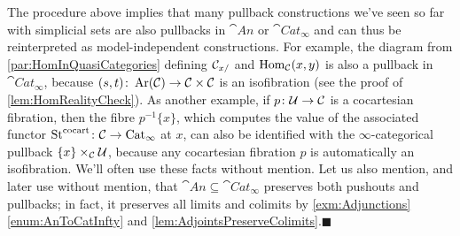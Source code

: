 \begin{numpar}
	The procedure above implies that many pullback constructions we've seen so far with simplicial sets are also pullbacks in $\cat{An}$ or $\cat{Cat}_\infty$ and can thus be reinterpreted as model-independent constructions. For example, the diagram from \cref{par:HomInQuasiCategories} defining $\mathcal{C}_{x/}$ and $\operatorname{Hom}_{\mathcal{C}}(x,y)$ is also a pullback in $\cat{Cat}_\infty$, because $(s,t)\colon \operatorname{Ar}(\mathcal{C})\rightarrow \mathcal{C}\times\mathcal{C}$ is an isofibration (see the proof of \cref{lem:HomRealityCheck}). As another example, if $p\colon\mathcal{U}\rightarrow \mathcal{C}$ is a cocartesian fibration, then the fibre $p^{-1}\{x\}$, which computes the value of the associated functor $\operatorname{St}^{\mathrm{cocart}}\colon \mathcal{C}\rightarrow\mathrm{Cat}_\infty$ at $x$, can also be identified with the $\infty$-categorical pullback $\{x\}\times_{\mathcal{C}}\mathcal{U}$, because any cocartesian fibration $p$ is automatically an isofibration. We'll often use these facts without mention. Let us also mention, and later use without mention, that $\cat{An}\subseteq\cat{Cat}_\infty$ preserves both pushouts and pullbacks; in fact, it preserves all limits and colimits by \cref{exm:Adjunctions}\cref{enum:AnToCatInfty} and \cref{lem:AdjointsPreserveColimits}.\hfill$\blacksquare$
\end{numpar}
